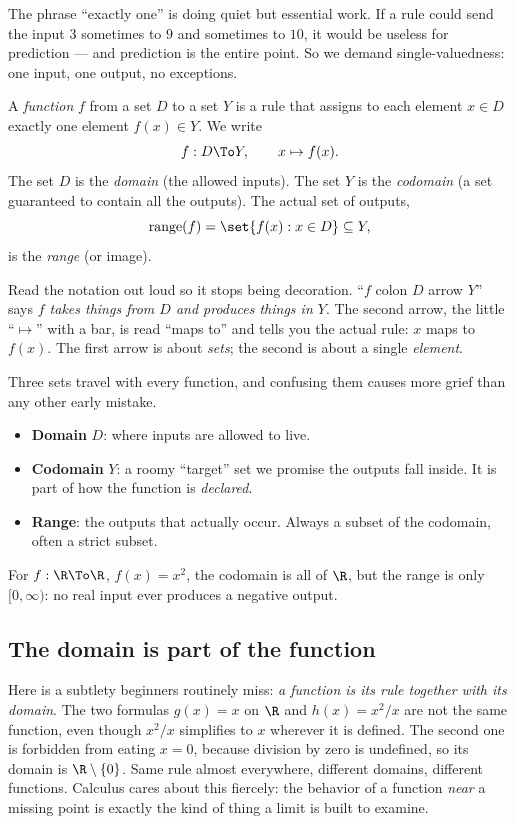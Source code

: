 The phrase ``exactly one'' is doing quiet but essential work. If a rule could send
the input $3$ sometimes to $9$ and sometimes to $10$, it would be useless for
prediction --- and prediction is the entire point. So we demand single-valuedness:
one input, one output, no exceptions.

\begin{definition}[Function]
\label{ch02:def-function}
A \emph{function} $f$ from a set $D$ to a set $Y$ is a rule that assigns to each
element $x \in D$ exactly one element $f(x) \in Y$. We write
\[
  f : D \To Y, \qquad x \mapsto f(x).
\]
The set $D$ is the \emph{domain} (the allowed inputs). The set $Y$ is the
\emph{codomain} (a set guaranteed to contain all the outputs). The actual set of
outputs,
\[
  \operatorname{range}(f) = \set{ f(x) : x \in D } \subseteq Y,
\]
is the \emph{range} (or image).
\end{definition}

Read the notation out loud so it stops being decoration. ``$f$ colon $D$ arrow
$Y$'' says \emph{$f$ takes things from $D$ and produces things in $Y$}. The
second arrow, the little ``$\mapsto$'' with a bar, is read ``maps to'' and tells
you the actual rule: $x$ maps to $f(x)$. The first arrow is about \emph{sets}; the
second is about a single \emph{element}.

\begin{focusbox}
Three sets travel with every function, and confusing them causes more grief than
any other early mistake.
\begin{itemize}
  \item \textbf{Domain} $D$: where inputs are allowed to live.
  \item \textbf{Codomain} $Y$: a roomy ``target'' set we promise the outputs fall
        inside. It is part of how the function is \emph{declared}.
  \item \textbf{Range}: the outputs that actually occur. Always a subset of the
        codomain, often a strict subset.
\end{itemize}
For $f:\R\To\R$, $f(x)=x^2$, the codomain is all of $\R$, but the range is only
$[0,\infty)$: no real input ever produces a negative output.
\end{focusbox}

\subsection{The domain is part of the function}

Here is a subtlety beginners routinely miss: \emph{a function is its rule
together with its domain}. The two formulas $g(x)=x$ on $\R$ and $h(x)=x^2/x$ are
not the same function, even though $x^2/x$ simplifies to $x$ wherever it is
defined. The second one is forbidden from eating $x=0$, because division by zero
is undefined, so its domain is $\R\setminus\{0\}$. Same rule almost everywhere,
different domains, different functions. Calculus cares about this fiercely: the
behavior of a function \emph{near} a missing point is exactly the kind of thing a
limit is built to examine.

